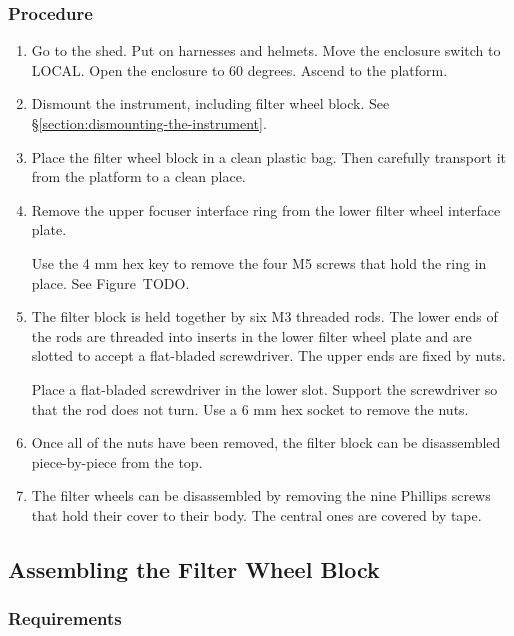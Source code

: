 \subsubsection{Procedure}

\begin{enumerate}

    \item Go to the shed. Put on harnesses and helmets. Move the enclosure switch to LOCAL. Open the enclosure to 60 degrees. Ascend to the platform.

    \item Dismount the instrument, including filter wheel block. See \S\ref{section:dismounting-the-instrument}.

   \item Place the filter wheel block in a clean plastic bag. Then carefully transport it from the platform to a clean place.
   
   \item Remove the upper focuser interface ring from the lower filter wheel interface plate. 
   
   Use the 4 mm hex key to remove the four M5 screws that hold the ring in place. See Figure~TODO.
   
  \item The filter block is held together by six M3 threaded rods. The lower ends of the rods are threaded into inserts in the lower filter wheel plate and are slotted to accept a flat-bladed screwdriver. The upper ends are fixed by nuts.
  
  Place a flat-bladed screwdriver in the lower slot. Support the screwdriver so that the rod does not turn. Use a 6 mm hex socket to remove the nuts.
  
  \item Once all of the nuts have been removed, the filter block can be disassembled piece-by-piece from the top.
  
 \item The filter wheels can be disassembled by removing the nine Phillips screws that hold their cover to their body. The central ones are covered by tape.
  
\end{enumerate}

\subsection{Assembling the Filter Wheel Block}

\subsubsection{Requirements}

